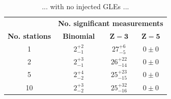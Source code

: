 \begin{table}[ht!]
	\begin{center}
		\caption{... with no injected GLEs ...}
		\label{tab:HS_14008_multi_sims_zeros}
		\begin{tabular}{c c c c}
			\hline 
			{} & \multicolumn{3}{c}{\bf No. significant measurements} \\ 
			{\bf No. stations} & {\bf Binomial} & {\bf $\mathbf{Z=3}$} & {\bf $\mathbf{Z=5}$}  \\ 
			\hline 
			1 & $ 2^{+2}_{-1} $ & $ 27^{+6}_{-5} $ & $ 0 \pm 0 $ \\ 
			2 & $ 2^{+3}_{-1} $ & $ 26^{+22}_{-14} $ & $ 0 \pm 0 $ \\ 
			5 & $ 2^{+4}_{-2} $ & $ 25^{+23}_{-15} $ & $ 0 \pm 0 $ \\ 
			10 & $ 2^{+3}_{-2} $ & $ 25^{+32}_{-16} $ & $ 0 \pm 0 $ \\ 
			\hline 
		\end{tabular} 
	\end{center}
\end{table}



